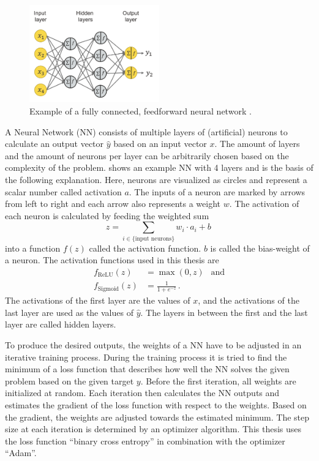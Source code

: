 \begin{figure}
    \centering
    \includegraphics[width=0.5\textwidth]{images/NN_schematic.png}
    \caption{Example of a fully connected, feedforward neural network \cite{NN_schematic}.}
    \label{fig:NN_schematic}
\end{figure}

A Neural Network (NN) consists of multiple layers of (artificial) neurons to calculate an output vector $\hat{y}$ based on an input vector $x$.
The amount of layers and the amount of neurons per layer can be arbitrarily chosen based on the complexity of the problem.
 shows an example NN with 4 layers and is the basis of the following explanation.
Here, neurons are visualized as circles and represent a scalar number called activation $a$. 
The inputs of a neuron are marked by arrows from left to right and each arrow also represents a weight $w$.
The activation of each neuron is calculated by feeding the weighted sum 
\begin{equation*}
    z = \sum_{i \in \{\text{input neurons}\}} w_i \cdot a_i + b \, 
\end{equation*}
into a function $f(z)$ called the activation function.
$b$ is called the bias-weight of a neuron.
The activation functions used in this thesis are 
\begin{align*}
    f_\text{ReLU}(z) &= \max(0, z) \:\:\text{  and} \\
    f_\text{Sigmoid}(z) &= \frac{1}{1+e^{-z}} \, .
\end{align*}
The activations of the first layer are the values of $x$, and the activations of the last layer are used as the values of $\hat{y}$.
The layers in between the first and the last layer are called hidden layers.

To produce the desired outputs, the weights of a NN have to be adjusted in an iterative training process.
During the training process it is tried to find the minimum of a loss function that describes how well the NN solves the given problem based on the given target $y$.
Before the first iteration, all weights are initialized at random.
Each iteration then calculates the NN outputs and estimates the gradient of the loss function with respect to the weights.
Based on the gradient, the weights are adjusted towards the estimated minimum.
The step size at each iteration is determined by an optimizer algorithm.
This thesis uses the loss function \enquote{binary cross entropy} in combination with the optimizer \enquote{Adam}\cite{adam}.

